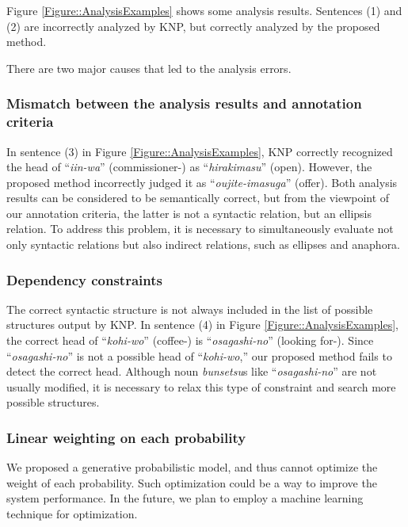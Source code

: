 \documentclass[english]{jnlp_1.4_rep}
\newcommand{\acc}{}
\newcommand{\gen}{}
\newcommand{\TOP}{}
\begin{document}
Figure \ref{Figure::AnalysisExamples} shows some analysis
results. Sentences (1) and (2) are incorrectly analyzed by KNP, but
correctly analyzed by the proposed method.

There are two major causes that led to the analysis errors.


\subsubsection{Mismatch between the analysis results and annotation criteria}

In sentence (3) in Figure \ref{Figure::AnalysisExamples}, KNP correctly
recognized the head of ``\textit{iin-wa}'' (commissioner-\TOP) as
``\textit{hirakimasu}'' (open).  However, the proposed method
incorrectly judged it as ``\textit{oujite-imasuga}'' (offer). Both
analysis results can be considered to be semantically correct, but from
the viewpoint of our annotation criteria, the latter is not a syntactic
relation, but an ellipsis relation. To address this problem, it is
necessary to simultaneously evaluate not only syntactic relations but
also indirect relations, such as ellipses and anaphora.


\subsubsection{Dependency constraints}

The correct syntactic structure is not always included in the list of
possible structures output by KNP. In sentence (4) in Figure
\ref{Figure::AnalysisExamples}, the correct head of ``\textit{kohi-wo}''
(coffee-\acc) is ``\textit{osagashi-no}'' (looking for-\gen). Since
``\textit{osagashi-no}'' is not a possible head of ``\textit{kohi-wo},''
our proposed method fails to detect the correct head. Although noun
\textit{bunsetsu}s like ``\textit{osagashi-no}'' are not usually modified, it is necessary to relax this type of constraint and search
more possible structures.


\subsubsection{Linear weighting on each probability}

We proposed a generative probabilistic model, and thus cannot optimize
the weight of each probability. Such optimization could be a way to
improve the system performance. In the future, we plan to employ a
machine learning technique for optimization.
\end{document}
